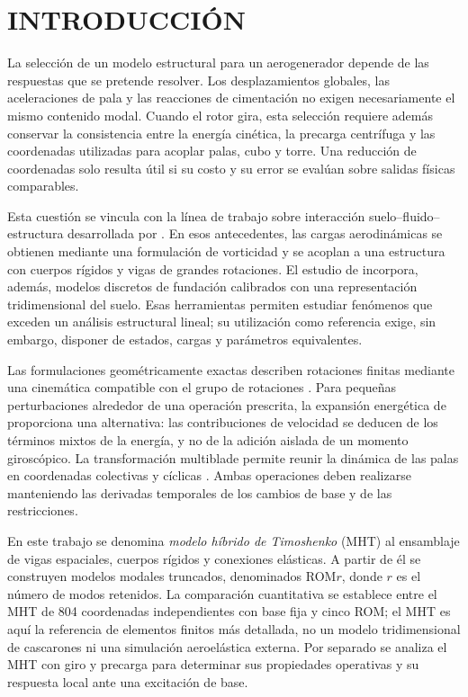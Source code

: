 \documentclass[oneside,a4paper,spanish,links,pagenumbers]{amca}
\begin{document}
\section{INTRODUCCIÓN}
La selección de un modelo estructural para un aerogenerador depende de las respuestas que se pretende resolver. Los desplazamientos globales, las aceleraciones de pala y las reacciones de cimentación no exigen necesariamente el mismo contenido modal. Cuando el rotor gira, esta selección requiere además conservar la consistencia entre la energía cinética, la precarga centrífuga y las coordenadas utilizadas para acoplar palas, cubo y torre. Una reducción de coordenadas solo resulta útil si su costo y su error se evalúan sobre salidas físicas comparables.

Esta cuestión se vincula con la línea de trabajo sobre interacción suelo--fluido--estructura desarrollada por \citet{maza2014,turello2023}. En esos antecedentes, las cargas aerodinámicas se obtienen mediante una formulación de vorticidad y se acoplan a una estructura con cuerpos rígidos y vigas de grandes rotaciones. El estudio de \citet{turello2023} incorpora, además, modelos discretos de fundación calibrados con una representación tridimensional del suelo. Esas herramientas permiten estudiar fenómenos que exceden un análisis estructural lineal; su utilización como referencia exige, sin embargo, disponer de estados, cargas y parámetros equivalentes.

Las formulaciones geométricamente exactas describen rotaciones finitas mediante una cinemática compatible con el grupo de rotaciones \citep{simo1985}. Para pequeñas perturbaciones alrededor de una operación prescrita, la expansión energética de \citet{meirovitch1997} proporciona una alternativa: las contribuciones de velocidad se deducen de los términos mixtos de la energía, y no de la adición aislada de un momento giroscópico. La transformación multiblade permite reunir la dinámica de las palas en coordenadas colectivas y cíclicas \citep{bir2008}. Ambas operaciones deben realizarse manteniendo las derivadas temporales de los cambios de base y de las restricciones.

En este trabajo se denomina \emph{modelo híbrido de Timoshenko} (MHT) al ensamblaje de vigas espaciales, cuerpos rígidos y conexiones elásticas. A partir de él se construyen modelos modales truncados, denominados ROM$r$, donde $r$ es el número de modos retenidos. La comparación cuantitativa se establece entre el MHT de 804 coordenadas independientes con base fija y cinco ROM; el MHT es aquí la referencia de elementos finitos más detallada, no un modelo tridimensional de cascarones ni una simulación aeroelástica externa. Por separado se analiza el MHT con giro y precarga para determinar sus propiedades operativas y su respuesta local ante una excitación de base.
\end{document}
